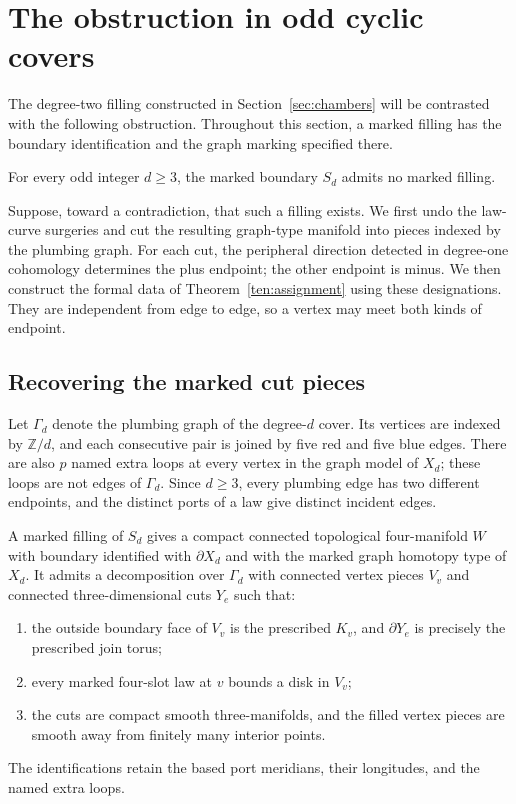 \section{The obstruction in odd cyclic covers}
\label{sec:formal}

The degree-two filling constructed in Section~\ref{sec:chambers} will
be contrasted with the following obstruction.  Throughout this section,
a marked filling has the boundary identification and the graph marking
specified there.

\begin{proposition}
\label{for:odd-nonfilling}
For every odd integer $d\geq3$, the marked boundary $S_d$ admits no
marked filling.
\end{proposition}

Suppose, toward a contradiction, that such a filling exists.  We first
undo the law-curve surgeries and cut the resulting graph-type manifold
into pieces indexed by the plumbing graph.  For each cut, the peripheral
direction detected in degree-one cohomology determines the plus endpoint;
the other endpoint is minus.  We then construct the formal data of
Theorem~\ref{ten:assignment} using these designations.  They are independent
from edge to edge, so a vertex may meet both kinds of endpoint.

\subsection{Recovering the marked cut pieces}

Let $\Gamma_d$ denote the plumbing graph of the degree-$d$ cover.
Its vertices are indexed by $\mathbb Z/d$, and each consecutive pair
is joined by five red and five blue edges.  There are also $p$ named
extra loops at every vertex in the graph model of $X_d$; these loops
are not edges of $\Gamma_d$.  Since $d\geq3$, every plumbing edge has
two different endpoints, and the distinct ports of a law give distinct
incident edges.

\begin{lemma}
\label{for:cuts}
A marked filling of $S_d$ gives a compact connected topological
four-manifold $W$ with boundary identified with $\partial X_d$ and
with the marked graph homotopy type of $X_d$.  It admits a decomposition
over $\Gamma_d$ with connected vertex pieces $V_v$ and connected
three-dimensional cuts $Y_e$ such that:
\begin{enumerate}
\item the outside boundary face of $V_v$ is the prescribed $K_v$,
and $\partial Y_e$ is precisely the prescribed join torus;
\item every marked four-slot law at $v$ bounds a disk in $V_v$;
\item the cuts are compact smooth three-manifolds, and the filled
vertex pieces are smooth away from finitely many interior points.
\end{enumerate}
The identifications retain the based port meridians, their longitudes,
and the named extra loops.
\end{lemma}

